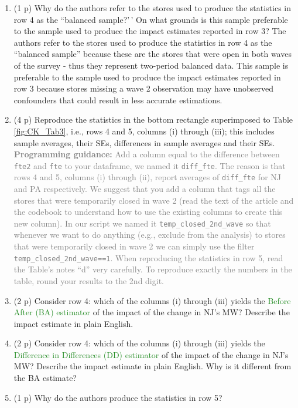 \documentclass[
]{article}
\begin{document}
\begin{enumerate}
\def\labelenumi{\alph{enumi}.}
\item
  (1 p) Why do the authors refer to the stores used to produce the
  statistics in row 4 as the ``balanced sample?'\,' On what grounds is
  this sample preferable to the sample used to produce the impact
  estimates reported in row 3? The authors refer to the stores used to
  produce the statistics in row 4 as the ``balanced sample'' because
  these are the stores that were open in both waves of the survey - thus
  they represent two-period balanced data. This sample is preferable to
  the sample used to produce the impact estimates reported in row 3
  because stores missing a wave 2 observation may have unobserved
  confounders that could result in less accurate estimations.
\item
  (4 p) Reproduce the statistics in the bottom rectangle superimposed to
  Table \ref{fig:CK_Tab3}, i.e., rows 4 and 5, columns (i) through
  (iii); this includes sample averages, their SEs, differences in sample
  averages and their SEs.
  \textcolor{gray}{\textbf{Programming guidance:} Add a column equal to the difference between \texttt{fte2} and \texttt{fte} to your dataframe, we named it \texttt{diff\_fte}. The reason is that rows 4 and 5, columns (i) through (ii), report averages of \texttt{diff\_fte} for NJ and PA respectively. We suggest that you add a column that tags all the stores that were temporarily closed in wave 2 (read the text of the article and the codebook to understand how to use the existing columns to create this new column). In our script we named it \texttt{temp\_closed\_2nd\_wave} so that whenever we want to do anything (e.g., exclude from the analysis) to stores that were temporarily closed in wave 2 we can simply use the filter \texttt{temp\_closed\_2nd\_wave==1}. When reproducing the statistics in row 5, read the Table's notes ``d'' very carefully. To reproduce exactly the numbers in the table, round your results to the 2nd digit.}
\item
  (2 p) Consider row 4: which of the columns (i) through (iii) yields
  the \textcolor{ForestGreen}{Before After (BA) estimator} of the impact
  of the change in NJ's MW? Describe the impact estimate in plain
  English.
\item
  (2 p) Consider row 4: which of the columns (i) through (iii) yields
  the \textcolor{ForestGreen}{Difference in Differences (DD) estimator}
  of the impact of the change in NJ's MW? Describe the impact estimate
  in plain English. Why is it different from the BA estimate?
\item
  (1 p) Why do the authors produce the statistics in row 5?
\end{enumerate}
\end{document}
